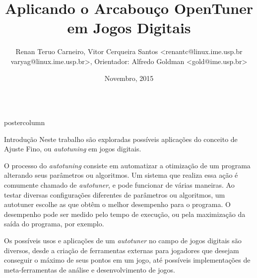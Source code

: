 \documentclass[final]{beamer}
\title{\huge Aplicando o Arcabouço OpenTuner em Jogos Digitais}
\author{Renan Teruo Carneiro, Vitor Cerqueira Santos <renantc@linux.ime.usp.br varyag@linux.ime.usp.br>, Orientador: Alfredo Goldman <gold@ime.usp.br>}
\institute[Universidade de São Paulo] %
{
  Instituto de Matemática e Estatística, Universidade de São Paulo - Trabalho
  de Conclusão de Curso
}
\date[Novembro 2015]{Novembro, 2015}
\newlength{\columnheight}
\begin{document}
\begin{frame}
  \begin{columns}
    \begin{column}{.5\textwidth}
      \begin{beamercolorbox}[center,wd=\textwidth]{postercolumn}
        \begin{minipage}[T]{.95\textwidth} %
          \parbox[t][\columnheight]{\textwidth}{ %
            
            \vspace*{0.8cm}
            
            \begin{block}{Introdução}
            \justifying
                Neste trabalho são exploradas possíveis aplicações do conceito de Ajuste Fino, ou \textit{autotuning} em jogos digitais. 
                                
                \vspace*{0.15cm}
                
                O processo do \textit{autotuning} consiste em automatizar a otimização de um programa alterando seus parâmetros ou algoritmos. Um sistema que realiza essa ação é comumente chamado de \textit{autotuner}, e pode funcionar de várias maneiras. Ao testar diversas configurações diferentes de parâmetros ou algoritmos, um autotuner escolhe as que obtêm o melhor desempenho para o programa. O desempenho pode ser medido pelo tempo de execução, ou pela maximização da saída do programa, por exemplo.
                
                \vspace*{0.15cm}
                
                Os possíveis usos e aplicações de um \textit{autotuner} no campo de jogos digitais são diversos, desde a criação de ferramentas externas para jogadores que desejam conseguir o máximo de seus pontos em um jogo, até possíveis implementações de meta-ferramentas de análise e desenvolvimento de jogos.
                
                \vspace*{0.15cm}
                

\end{block}}
\end{minipage}
\end{beamercolorbox}
\end{column}
\end{columns}
\end{frame}
\end{document}

